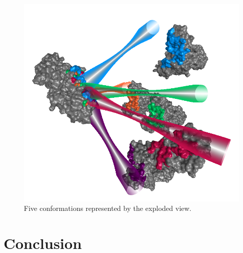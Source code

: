 \documentclass[journal]{vgtc}                %
\begin{document}
\begin{figure}[bt]
  \centering
  \includegraphics[width=0.8\columnwidth]{case2.png}
  \caption{Five conformations represented by the exploded view.}
  \label{fig:case2}
\end{figure}

\section{Conclusion}


%

%
%
%

\end{document}
